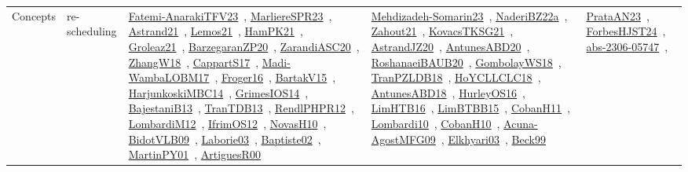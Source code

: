 {\begin{longtable}{lp{3cm}>{\raggedright\arraybackslash}p{6cm}>{\raggedright\arraybackslash}p{6cm}>{\raggedright\arraybackslash}p{8cm}}
Concepts & re-scheduling & \href{../works/Fatemi-AnarakiTFV23.pdf}{Fatemi-AnarakiTFV23}~\cite{Fatemi-AnarakiTFV23}, \href{../works/MarliereSPR23.pdf}{MarliereSPR23}~\cite{MarliereSPR23}, \href{../works/Astrand21.pdf}{Astrand21}~\cite{Astrand21}, \href{../works/Lemos21.pdf}{Lemos21}~\cite{Lemos21}, \href{../works/HamPK21.pdf}{HamPK21}~\cite{HamPK21}, \href{../works/Groleaz21.pdf}{Groleaz21}~\cite{Groleaz21}, \href{../works/BarzegaranZP20.pdf}{BarzegaranZP20}~\cite{BarzegaranZP20}, \href{../works/ZarandiASC20.pdf}{ZarandiASC20}~\cite{ZarandiASC20}, \href{../works/ZhangW18.pdf}{ZhangW18}~\cite{ZhangW18}, \href{../works/CappartS17.pdf}{CappartS17}~\cite{CappartS17}, \href{../works/Madi-WambaLOBM17.pdf}{Madi-WambaLOBM17}~\cite{Madi-WambaLOBM17}, \href{../works/Froger16.pdf}{Froger16}~\cite{Froger16}, \href{../works/BartakV15.pdf}{BartakV15}~\cite{BartakV15}, \href{../works/HarjunkoskiMBC14.pdf}{HarjunkoskiMBC14}~\cite{HarjunkoskiMBC14}, \href{../works/GrimesIOS14.pdf}{GrimesIOS14}~\cite{GrimesIOS14}, \href{../works/BajestaniB13.pdf}{BajestaniB13}~\cite{BajestaniB13}, \href{../works/TranTDB13.pdf}{TranTDB13}~\cite{TranTDB13}, \href{../works/RendlPHPR12.pdf}{RendlPHPR12}~\cite{RendlPHPR12}, \href{../works/LombardiM12.pdf}{LombardiM12}~\cite{LombardiM12}, \href{../works/IfrimOS12.pdf}{IfrimOS12}~\cite{IfrimOS12}, \href{../works/NovasH10.pdf}{NovasH10}~\cite{NovasH10}, \href{../works/BidotVLB09.pdf}{BidotVLB09}~\cite{BidotVLB09}, \href{../works/Laborie03.pdf}{Laborie03}~\cite{Laborie03}, \href{../works/Baptiste02.pdf}{Baptiste02}~\cite{Baptiste02}, \href{../works/MartinPY01.pdf}{MartinPY01}~\cite{MartinPY01}, \href{../works/ArtiguesR00.pdf}{ArtiguesR00}~\cite{ArtiguesR00} & \href{../works/Mehdizadeh-Somarin23.pdf}{Mehdizadeh-Somarin23}~\cite{Mehdizadeh-Somarin23}, \href{../works/NaderiBZ22a.pdf}{NaderiBZ22a}~\cite{NaderiBZ22a}, \href{../works/Zahout21.pdf}{Zahout21}~\cite{Zahout21}, \href{../works/KovacsTKSG21.pdf}{KovacsTKSG21}~\cite{KovacsTKSG21}, \href{../works/AstrandJZ20.pdf}{AstrandJZ20}~\cite{AstrandJZ20}, \href{../works/AntunesABD20.pdf}{AntunesABD20}~\cite{AntunesABD20}, \href{../works/RoshanaeiBAUB20.pdf}{RoshanaeiBAUB20}~\cite{RoshanaeiBAUB20}, \href{../works/GombolayWS18.pdf}{GombolayWS18}~\cite{GombolayWS18}, \href{../works/TranPZLDB18.pdf}{TranPZLDB18}~\cite{TranPZLDB18}, \href{../works/HoYCLLCLC18.pdf}{HoYCLLCLC18}~\cite{HoYCLLCLC18}, \href{../works/AntunesABD18.pdf}{AntunesABD18}~\cite{AntunesABD18}, \href{../works/HurleyOS16.pdf}{HurleyOS16}~\cite{HurleyOS16}, \href{../works/LimHTB16.pdf}{LimHTB16}~\cite{LimHTB16}, \href{../works/LimBTBB15.pdf}{LimBTBB15}~\cite{LimBTBB15}, \href{../works/CobanH11.pdf}{CobanH11}~\cite{CobanH11}, \href{../works/Lombardi10.pdf}{Lombardi10}~\cite{Lombardi10}, \href{../works/CobanH10.pdf}{CobanH10}~\cite{CobanH10}, \href{../works/Acuna-AgostMFG09.pdf}{Acuna-AgostMFG09}~\cite{Acuna-AgostMFG09}, \href{../works/Elkhyari03.pdf}{Elkhyari03}~\cite{Elkhyari03}, \href{../works/Beck99.pdf}{Beck99}~\cite{Beck99} & \href{../works/PrataAN23.pdf}{PrataAN23}~\cite{PrataAN23}, \href{../works/ForbesHJST24.pdf}{ForbesHJST24}~\cite{ForbesHJST24}, \href{../works/abs-2306-05747.pdf}{abs-2306-05747}~\cite{abs-2306-05747}, 
\end{longtable}}
